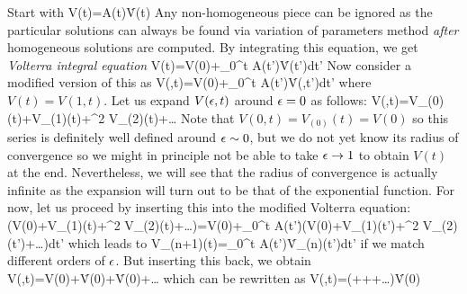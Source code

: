 {\begin{enumerate}
		Start with
		\be 
		V(t)=A(t)\.V(t)
		\ee  
		Any non-homogeneous piece can be ignored as the particular solutions can always be found via variation of parameters method \emph{after} homogeneous solutions are computed. By integrating this equation, we get \emph{Volterra integral equation}
		\be 
		V(t)=V(0)+\int\limits_{0}^t A(t')\. V(t')dt'
		\ee 
		Now consider a modified version of this as 
		\be 
		V(\e,t)=V(0)+\e\int\limits_{0}^t A(t')\. V(\e,t')dt'
		\ee
		where $V(t)=V(1,t)$. Let us expand $V(\epsilon,t)$ around $\epsilon=0$ as follows:
		\be 
		V(\e,t)=V_{(0)}(t)+\e V_{(1)}(t)+\e^2 V_{(2)}(t)+\dots
		\ee 
		Note that $V(0,t)=V_{(0)}(t)=V(0)$ so this series is definitely well defined around $\epsilon\sim 0$, but we do not yet know its radius of convergence so we might in principle not be able to take $\epsilon\to 1$ to  obtain $V(t)$ at the end. Nevertheless, we will see that the radius of convergence is actually infinite as the expansion will turn out to be that of the exponential function. For now, let us proceed by inserting this into the modified Volterra equation:
		\be 
		\left(V(0)+\e V_{(1)}(t)+\e^2 V_{(2)}(t)+\dots\right)=V(0)+\e\int\limits_{0}^t A(t')\. \left(V(0)+\e V_{(1)}(t')+\e^2 V_{(2)}(t')+\dots\right)dt'
		\ee
		which leads to
		\be 
		V_{(n+1)}(t)=\int\limits_{0}^t A(t')\. V_{(n)}(t')dt'
		\ee
		if we match different orders of $\epsilon$. But inserting this back, we obtain
		\be 
		V(\e,t)=V(0)+\. V(0)+\. V(0)+\dots 
		\ee 
		which can be rewritten as 
		\be 
		\label{temp1}
		V(\e,t)=\left(+++\dots\right)\. V(0)
		\ee 
		

\end{enumerate}}
